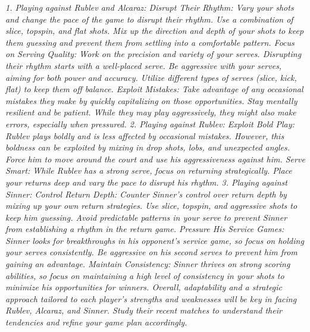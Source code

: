 \emph{
1. Playing against Rublev and Alcaraz:
Disrupt Their Rhythm:
Vary your shots and change the pace of the game to disrupt their rhythm. Use a combination of slice, topspin, and flat shots.
Mix up the direction and depth of your shots to keep them guessing and prevent them from settling into a comfortable pattern.
Focus on Serving Quality:
Work on the precision and variety of your serves. Disrupting their rhythm starts with a well-placed serve.
Be aggressive with your serves, aiming for both power and accuracy. Utilize different types of serves (slice, kick, flat) to keep them off balance.
Exploit Mistakes:
Take advantage of any occasional mistakes they make by quickly capitalizing on those opportunities.
Stay mentally resilient and be patient. While they may play aggressively, they might also make errors, especially when pressured.
2. Playing against Rublev:
Exploit Bold Play:
Rublev plays boldly and is less affected by occasional mistakes. However, this boldness can be exploited by mixing in drop shots, lobs, and unexpected angles.
Force him to move around the court and use his aggressiveness against him.
Serve Smart:
While Rublev has a strong serve, focus on returning strategically. Place your returns deep and vary the pace to disrupt his rhythm.
3. Playing against Sinner:
Control Return Depth:
Counter Sinner's control over return depth by mixing up your own return strategies. Use slice, topspin, and aggressive shots to keep him guessing.
Avoid predictable patterns in your serve to prevent Sinner from establishing a rhythm in the return game.
Pressure His Service Games:
Sinner looks for breakthroughs in his opponent’s service game, so focus on holding your serves consistently.
Be aggressive on his second serves to prevent him from gaining an advantage.
Maintain Consistency:
Sinner thrives on strong scoring abilities, so focus on maintaining a high level of consistency in your shots to minimize his opportunities for winners.
Overall, adaptability and a strategic approach tailored to each player's strengths and weaknesses will be key in facing Rublev, Alcaraz, and Sinner. Study their recent matches to understand their tendencies and refine your game plan accordingly.
}


